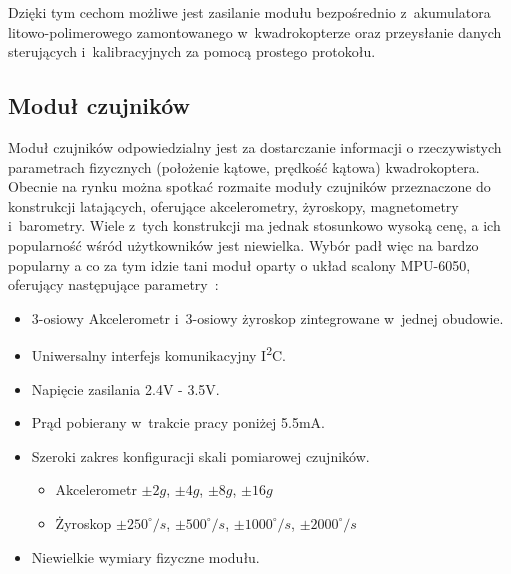 Dzięki tym cechom możliwe jest zasilanie modułu bezpośrednio z~akumulatora litowo-polimerowego zamontowanego w~kwadrokopterze oraz przeysłanie danych sterujących i~kalibracyjnych za pomocą prostego protokołu.

\subsection{Moduł czujników}
Moduł czujników odpowiedzialny jest za dostarczanie informacji o rzeczywistych parametrach fizycznych (położenie kątowe, prędkość kątowa) kwadrokoptera. Obecnie na rynku można spotkać rozmaite moduły czujników przeznaczone do konstrukcji latających, oferujące akcelerometry, żyroskopy, magnetometry i~barometry. Wiele z~tych konstrukcji ma jednak stosunkowo wysoką cenę, a ich popularność wśród użytkowników jest niewielka. Wybór padł więc na bardzo popularny a co za tym idzie tani moduł oparty o układ scalony MPU-6050, oferujący następujące parametry~\cite{ds_mpu6050, ds_mpu6050rm}:

\begin{itemize}
	\item 3-osiowy Akcelerometr i~3-osiowy żyroskop zintegrowane w~jednej obudowie.
	\item Uniwersalny interfejs komunikacyjny I\textsuperscript{2}C.
	\item Napięcie zasilania 2.4V - 3.5V.
	\item Prąd pobierany w~trakcie pracy poniżej 5.5mA.
	\item Szeroki zakres konfiguracji skali pomiarowej czujników.
		\begin{itemize}
			\item Akcelerometr $\pm 2g$, $\pm 4g$, $\pm 8g$, $\pm 16g$
			\item Żyroskop $\pm 250^{\circ}/s$, $\pm 500^{\circ}/s$, $\pm 1000^{\circ}/s$, $\pm 2000^{\circ}/s$
		\end{itemize}
	\item Niewielkie wymiary fizyczne modułu.
\end{itemize}

